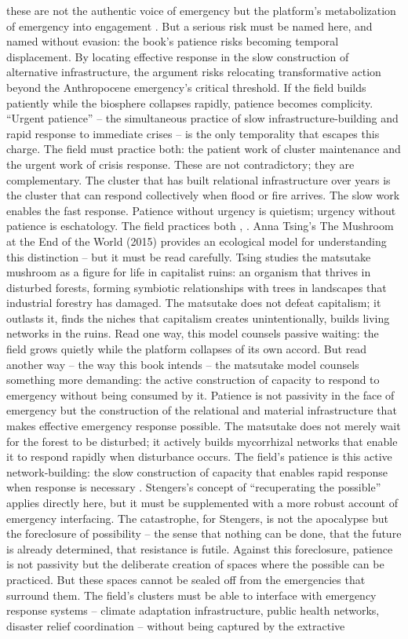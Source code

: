 these are not the authentic voice of emergency but the platform’s metabolization of emergency into engagement \cite[pp.~33-52]{stengers_2015}. But a serious risk must be named here, and named without evasion: the book’s patience risks becoming temporal displacement. By locating effective response in the slow construction of alternative infrastructure, the argument risks relocating transformative action beyond the Anthropocene emergency’s critical threshold. If the field builds patiently while the biosphere collapses rapidly, patience becomes complicity. “Urgent patience” – the simultaneous practice of slow infrastructure-building and rapid response to immediate crises – is the only temporality that escapes this charge. The field must practice both: the patient work of cluster maintenance and the urgent work of crisis response. These are not contradictory; they are complementary. The cluster that has built relational infrastructure over years is the cluster that can respond collectively when flood or fire arrives. The slow work enables the fast response. Patience without urgency is quietism; urgency without patience is eschatology. The field practices both \cite{stengers_2015}, \cite{tsing_2015}. Anna Tsing’s The Mushroom at the End of the World (2015) provides an ecological model for understanding this distinction – but it must be read carefully. Tsing studies the matsutake mushroom as a figure for life in capitalist ruins: an organism that thrives in disturbed forests, forming symbiotic relationships with trees in landscapes that industrial forestry has damaged. The matsutake does not defeat capitalism; it outlasts it, finds the niches that capitalism creates unintentionally, builds living networks in the ruins. Read one way, this model counsels passive waiting: the field grows quietly while the platform collapses of its own accord. But read another way – the way this book intends – the matsutake model counsels something more demanding: the active construction of capacity to respond to emergency without being consumed by it. Patience is not passivity in the face of emergency but the construction of the relational and material infrastructure that makes effective emergency response possible. The matsutake does not merely wait for the forest to be disturbed; it actively builds mycorrhizal networks that enable it to respond rapidly when disturbance occurs. The field’s patience is this active network-building: the slow construction of capacity that enables rapid response when response is necessary \cite[pp.~1-24]{tsing_2015}. Stengers’s concept of “recuperating the possible” applies directly here, but it must be supplemented with a more robust account of emergency interfacing. The catastrophe, for Stengers, is not the apocalypse but the foreclosure of possibility – the sense that nothing can be done, that the future is already determined, that resistance is futile. Against this foreclosure, patience is not passivity but the deliberate creation of spaces where the possible can be practiced. But these spaces cannot be sealed off from the emergencies that surround them. The field’s clusters must be able to interface with emergency response systems – climate adaptation infrastructure, public health networks, disaster relief coordination – without being captured by the extractive 